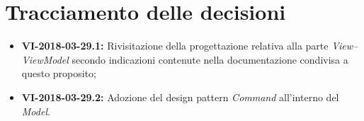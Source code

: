 \documentclass[openany,12pt,a4paper]{article}
\begin{document}
  \section{Tracciamento delle decisioni} 
   
  \begin{itemize} 
      \item \textbf{VI-2018-03-29.1:} Rivisitazione della progettazione relativa alla parte \textit{View–ViewModel} secondo indicazioni contenute nella documentazione condivisa a questo proposito;
      \item \textbf{VI-2018-03-29.2:} Adozione del design pattern \textit{Command} all'interno del \textit{Model}. 
  \end{itemize} 
   
  
\end{document}
